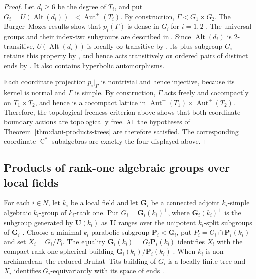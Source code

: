 \documentclass[11pt]{amsart}
\numberwithin{equation}{section}
\newcommand{\Aut}{\operatorname{Aut}}
\newcommand{\rC}{\operatorname{C}}
\theoremstyle{definition}
\begin{document}
	\begin{proof}
		Let \(d_i\geq6\) be the degree of \(T_i\), and put
		\(G_i=U(\operatorname{Alt}(d_i))^+<\Aut^+(T_i)\). By construction,
		\(\Gamma<G_1\times G_2\).
		The Burger--Mozes results show that \(p_i(\Gamma)\) is dense in \(G_i\) for
		\(i=1,2\) \cite[Theorem~5.5]{BM00b}. The universal groups and their index-two
		subgroups are described in
		\cite[Section~3.2 and Proposition~3.2.1]{BM00a}. Since
		\(\operatorname{Alt}(d_i)\) is \(2\)-transitive,
		\(U(\operatorname{Alt}(d_i))\) is locally \(\infty\)-transitive by
		\cite[Section~3.2]{BM00a}. Its plus subgroup \(G_i\) retains this property by
		\cite[Proposition~3.1.2(2)]{BM00a}, and hence acts transitively on ordered pairs
		of distinct ends by \cite[Lemma~3.1.1]{BM00a}. It also contains hyperbolic
		automorphisms.

		Each coordinate projection \(p_i|_\Gamma\) is nontrivial and hence injective,
		because its kernel is normal and \(\Gamma\) is simple. By construction,
		\(\Gamma\) acts freely and cocompactly on \(T_1\times T_2\), and hence is a
		cocompact lattice in \(\Aut^+(T_1)\times\Aut^+(T_2)\). Therefore,
		the topological-freeness criterion above shows that both
		coordinate boundary actions are topologically free. All the hypotheses of
		Theorem~\ref{thm:dani-products-trees} are therefore satisfied. The corresponding
		coordinate \(\rC^*\)-subalgebras are exactly the four displayed above.
	\end{proof}
	
	\subsection{Products of rank-one algebraic groups over local fields}
	
	For each $i\in N$, let $k_i$ be a local field and let $\mathbf G_i$ be a
	connected adjoint $k_i$-simple algebraic $k_i$-group of $k_i$-rank one. Put
	$G_i=\mathbf G_i(k_i)^+$, where $\mathbf G_i(k_i)^+$ is the subgroup generated
	by $\mathbf U(k_i)$ as $\mathbf U$ ranges over the unipotent $k_i$-split
	subgroups of $\mathbf G_i$ \cite[Proposition~I.5.4(i)]{Ma91}.
	Choose a minimal $k_i$-parabolic subgroup $\mathbf P_i<\mathbf G_i$, put
	$P_i=G_i\cap\mathbf P_i(k_i)$ and set $X_i=G_i/P_i$. The equality
	$\mathbf G_i(k_i)=G_i\mathbf P_i(k_i)$ identifies $X_i$ with the compact
	rank-one spherical building $\mathbf G_i(k_i)/\mathbf P_i(k_i)$
	\cite[Proposition~I.5.4(vi)]{Ma91}.
	When $k_i$ is non-archimedean, the reduced Bruhat--Tits building of $G_i$ is a
	locally finite tree and $X_i$ identifies $G_i$-equivariantly with its space of
	ends \cite{BT72}.
	
\end{document}
